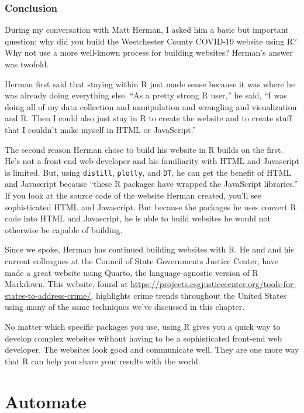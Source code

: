 \documentclass[
]{book}
\begin{document}
\hypertarget{conclusion-1}{%
\section*{Conclusion}\label{conclusion-1}}

During my conversation with Matt Herman, I asked him a basic but important question: why did you build the Westchester County COVID-19 website using R? Why not use a more well-known process for building websites? Herman's answer was twofold.

Herman first said that staying within R just made sense because it was where he was already doing everything else. ``As a pretty strong R user,'' he said, ``I was doing all of my data collection and manipulation and wrangling and visualization and R. Then I could also just stay in R to create the website and to create stuff that I couldn't make myself in HTML or JavaScript.''

The second reason Herman chose to build his website in R builds on the first. He's not a front-end web developer and his familiarity with HTML and Javascript is limited. But, using \texttt{distill}, \texttt{plotly}, and \texttt{DT}, he can get the benefit of HTML and Javascript because ``these R packages have wrapped the JavaScript libraries.'' If you look at the source code of the website Herman created, you'll see sophisticated HTML and Javascript. But because the packages he uses convert R code into HTML and Javascript, he is able to build websites he would not otherwise be capable of building.

Since we spoke, Herman has continued building websites with R.
He and and his current colleagues at the Council of State Governments Justice Center, have made a great website using Quarto, the language-agnostic version of R Markdown. This website, found at \url{https://projects.csgjusticecenter.org/tools-for-states-to-address-crime/}, highlights crime trends throughout the United States using many of the same techniques we've discussed in this chapter.

No matter which specific packages you use, using R gives you a quick way to develop complex websites without having to be a sophisticated front-end web developer. The websites look good and communicate well. They are one more way that R can help you share your results with the world.

\hypertarget{part-automate}{%
\part*{Automate}\label{part-automate}}
\end{document}
